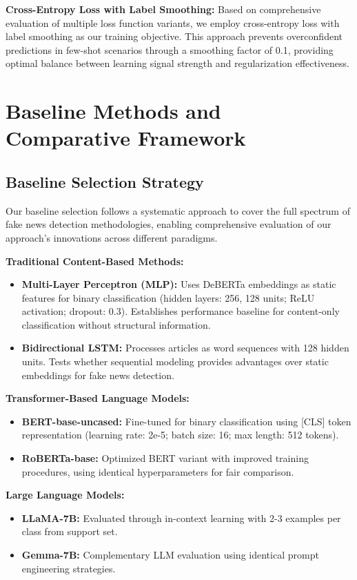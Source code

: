 \textbf{Cross-Entropy Loss with Label Smoothing:} Based on comprehensive evaluation of multiple loss function variants, we employ cross-entropy loss with label smoothing as our training objective. This approach prevents overconfident predictions in few-shot scenarios through a smoothing factor of 0.1, providing optimal balance between learning signal strength and regularization effectiveness.

\section{Baseline Methods and Comparative Framework}

\subsection{Baseline Selection Strategy}

Our baseline selection follows a systematic approach to cover the full spectrum of fake news detection methodologies, enabling comprehensive evaluation of our approach's innovations across different paradigms.

\textbf{Traditional Content-Based Methods:}
\begin{itemize}
\item \textbf{Multi-Layer Perceptron (MLP):} Uses DeBERTa embeddings as static features for binary classification (hidden layers: 256, 128 units; ReLU activation; dropout: 0.3). Establishes performance baseline for content-only classification without structural information.

\item \textbf{Bidirectional LSTM:} Processes articles as word sequences with 128 hidden units. Tests whether sequential modeling provides advantages over static embeddings for fake news detection.
\end{itemize}

\textbf{Transformer-Based Language Models:}
\begin{itemize}
\item \textbf{BERT-base-uncased:} Fine-tuned for binary classification using [CLS] token representation (learning rate: 2e-5; batch size: 16; max length: 512 tokens).

\item \textbf{RoBERTa-base:} Optimized BERT variant with improved training procedures, using identical hyperparameters for fair comparison.
\end{itemize}

\textbf{Large Language Models:}
\begin{itemize}
\item \textbf{LLaMA-7B:} Evaluated through in-context learning with 2-3 examples per class from support set.

\item \textbf{Gemma-7B:} Complementary LLM evaluation using identical prompt engineering strategies.
\end{itemize}

